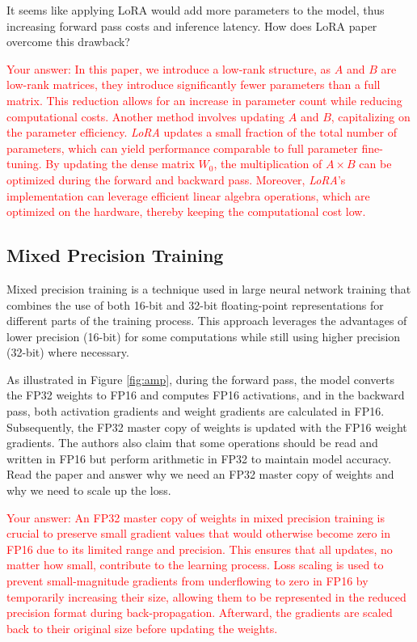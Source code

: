 It seems like applying LoRA would add more parameters to the model, thus increasing forward pass costs and inference latency. How does LoRA paper overcome this drawback?

\textcolor{red}{
Your answer: In this paper, we introduce a low-rank structure, as \( A \) and \( B \) are low-rank matrices, they introduce significantly fewer parameters than a full matrix. This reduction allows for an increase in parameter count while reducing computational costs. Another method involves updating \( A \) and \( B \), capitalizing on the parameter efficiency. \textit{LoRA} updates a small fraction of the total number of parameters, which can yield performance comparable to full parameter fine-tuning. By updating the dense matrix \( W_0 \), the multiplication of \( A \times B \) can be optimized during the forward and backward pass. Moreover, \textit{LoRA}'s implementation can leverage efficient linear algebra operations, which are optimized on the hardware, thereby keeping the computational cost low.
}

\subsection{Mixed Precision Training}
Mixed precision training \cite{micikevicius2018mixed} is a technique used in large neural network training that combines the use of both 16-bit and 32-bit floating-point representations for different parts of the training process. This approach leverages the advantages of lower precision (16-bit) for some computations while still using higher precision (32-bit) where necessary. 

As illustrated in Figure \ref{fig:amp}, during the forward pass, the model converts the FP32 weights to FP16 and computes FP16 activations, and in the backward pass, both activation gradients and weight gradients are calculated in FP16. Subsequently, the FP32 master copy of weights is updated with the FP16 weight gradients. The authors also claim that some operations should be read and written in FP16 but perform arithmetic in FP32 to maintain model accuracy. Read the paper and answer why we need an FP32 master copy of weights and why we need to scale up the loss.

\textcolor{red}{
Your answer: An FP32 master copy of weights in mixed precision training is crucial to preserve small gradient values that would otherwise become zero in FP16 due to its limited range and precision. This ensures that all updates, no matter how small, contribute to the learning process. Loss scaling is used to prevent small-magnitude gradients from underflowing to zero in FP16 by temporarily increasing their size, allowing them to be represented in the reduced precision format during back-propagation. Afterward, the gradients are scaled back to their original size before updating the weights.
}

